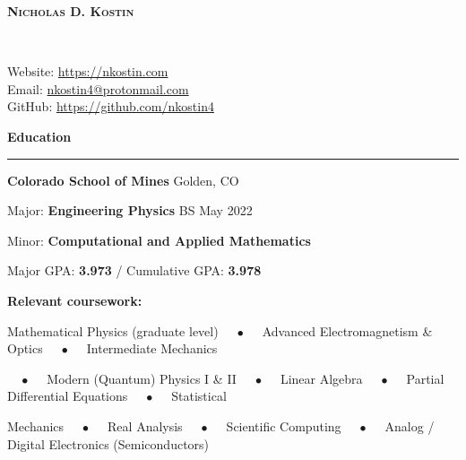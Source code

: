 \documentclass{article}
\begin{document}
\thispagestyle{empty}

\begin{minipage}{0.63\textwidth}
\begin{flushleft}
\textsc{\Huge{\textbf{Nicholas D. Kostin}}}
\end{flushleft}
\end{minipage}
~
\begin{minipage}{0.35\textwidth}
\begin{flushright}
\parbox[c]{\textwidth}{Website: \url{https://nkostin.com} \\ Email: \href{mailto:nkostin4@protonmail.com}{nkostin4@protonmail.com} \\ GitHub: \url{https://github.com/nkostin4}}
\end{flushright}
\end{minipage}

\vspace{1.6em}

\textbf{\Large{Education}} \\[-0.5em]
\rule{\textwidth}{1pt}

\hspace{1.5em} \textbf{Colorado School of Mines} \hfill Golden, CO

\hspace{1.5em} Major: \textbf{Engineering Physics} \hfill BS May 2022

\hspace{1.5em} Minor: \textbf{Computational and Applied Mathematics}

\vspace{1em}

\hspace{1.5em} Major GPA: \textbf{3.973} / Cumulative GPA: \textbf{3.978}

\vspace{1em}

\hspace{1.5em} \textbf{Relevant coursework:}

\hspace{3.0em} Mathematical Physics (graduate level) $\quad\bullet\quad$ Advanced Electromagnetism \& Optics $\quad\bullet\quad$ Intermediate Mechanics

\hspace{3.0em} $\quad\bullet\quad$ Modern (Quantum) Physics I \& II $\quad\bullet\quad$ Linear Algebra $\quad\bullet\quad$ Partial Differential Equations $\quad\bullet\quad$ Statistical

\hspace{3.0em} Mechanics $\quad\bullet\quad$ Real Analysis $\quad\bullet\quad$ Scientific Computing $\quad\bullet\quad$ Analog / Digital Electronics (Semiconductors)
\end{document}
